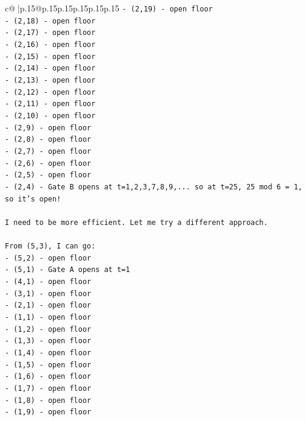 \documentclass{article}
\begin{document}
{\begin{supertabular}{c@{$\;$}|p{.15\linewidth}@{}p{.15\linewidth}p{.15\linewidth}p{.15\linewidth}p{.15\linewidth}p{.15\linewidth}}
{{{\texttt{{-} (2,19) {-} open floor} \\
\texttt{{-} (2,18) {-} open floor} \\
\texttt{{-} (2,17) {-} open floor} \\
\texttt{{-} (2,16) {-} open floor} \\
\texttt{{-} (2,15) {-} open floor} \\
\texttt{{-} (2,14) {-} open floor} \\
\texttt{{-} (2,13) {-} open floor} \\
\texttt{{-} (2,12) {-} open floor} \\
\texttt{{-} (2,11) {-} open floor} \\
\texttt{{-} (2,10) {-} open floor} \\
\texttt{{-} (2,9) {-} open floor} \\
\texttt{{-} (2,8) {-} open floor} \\
\texttt{{-} (2,7) {-} open floor} \\
\texttt{{-} (2,6) {-} open floor} \\
\texttt{{-} (2,5) {-} open floor} \\
\texttt{{-} (2,4) {-} Gate B opens at t=1,2,3,7,8,9,... so at t=25, 25 mod 6 = 1, so it's open!} \\
\\ 
\texttt{I need to be more efficient. Let me try a different approach.} \\
\\ 
\texttt{From (5,3), I can go:} \\
\texttt{{-} (5,2) {-} open floor} \\
\texttt{{-} (5,1) {-} Gate A opens at t=1} \\
\texttt{{-} (4,1) {-} open floor} \\
\texttt{{-} (3,1) {-} open floor} \\
\texttt{{-} (2,1) {-} open floor} \\
\texttt{{-} (1,1) {-} open floor} \\
\texttt{{-} (1,2) {-} open floor} \\
\texttt{{-} (1,3) {-} open floor} \\
\texttt{{-} (1,4) {-} open floor} \\
\texttt{{-} (1,5) {-} open floor} \\
\texttt{{-} (1,6) {-} open floor} \\
\texttt{{-} (1,7) {-} open floor} \\
\texttt{{-} (1,8) {-} open floor} \\
\texttt{{-} (1,9) {-} open floor} \\
}}}
\end{supertabular}}
\end{document}

